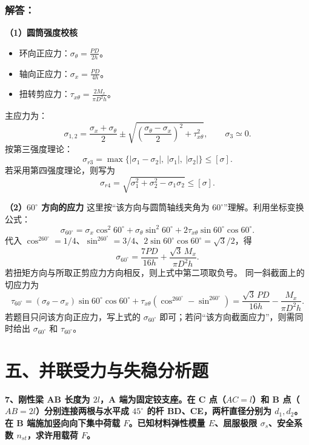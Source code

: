 \documentclass[11pt,a4paper]{ctexrep}
\begin{document}
{\subsubsection*{解答：}
\textbf{（1）圆筒强度校核}
\begin{itemize}
    \item 环向正应力：$\sigma_\theta = \frac{P D}{2h}$。
    \item 轴向正应力：$\sigma_x = \frac{P D}{4h}$。
    \item 扭转剪应力：$\tau_{x\theta} = \frac{2 M_x}{\pi D^2 h}$。
\end{itemize}
主应力为：
\[
    \sigma_{1,2} =
    \frac{\sigma_x+\sigma_\theta}{2}
    \pm
    \sqrt{\left(\frac{\sigma_\theta-\sigma_x}{2}\right)^2+\tau_{x\theta}^2},
    \qquad \sigma_3\simeq0.
\]
按第三强度理论：
\[
    \sigma_{r3}
    =
    \max\{|\sigma_1-\sigma_2|,\ |\sigma_1|,\ |\sigma_2|\}
    \le [\sigma]
    .
\]
若采用第四强度理论，则写为
\[
    \sigma_{r4}
    =
    \sqrt{\sigma_1^2+\sigma_2^2-\sigma_1\sigma_2}
    \le[\sigma].
\]

\textbf{（2）$60^\circ$ 方向的应力}
这里按“该方向与圆筒轴线夹角为 $60^\circ$”理解。利用坐标变换公式：
\[
    \sigma_{60^\circ}
    = \sigma_x \cos^2 60^\circ
    + \sigma_\theta \sin^2 60^\circ
    +2\tau_{x\theta}\sin60^\circ\cos60^\circ.
\]
代入 $\cos^260^\circ=1/4$、$\sin^260^\circ=3/4$、$2\sin60^\circ\cos60^\circ=\sqrt3/2$，得
\[
    \sigma_{60^\circ}
    =
    \frac{7PD}{16h}
    +\frac{\sqrt3\,M_x}{\pi D^2h}
    .
\]
若扭矩方向与所取正剪应力方向相反，则上式中第二项取负号。
同一斜截面上的切应力为
\[
    \tau_{60^\circ}
    =
    (\sigma_\theta-\sigma_x)\sin60^\circ\cos60^\circ
    +\tau_{x\theta}(\cos^260^\circ-\sin^260^\circ)
    =
    \frac{\sqrt3\,PD}{16h}
    -\frac{M_x}{\pi D^2h}.
\]
若题目只问该方向正应力，写上式的 $\sigma_{60^\circ}$ 即可；若问“该方向截面应力”，则需同时给出 $\sigma_{60^\circ}$ 和 $\tau_{60^\circ}$。




\section*{五、并联受力与失稳分析题}

\textbf{7、刚性梁 AB 长度为 $2l$，A 端为固定铰支座。在 C 点（$AC=l$）和 B 点（$AB=2l$）分别连接两根与水平成 $45^\circ$ 的杆 BD、CE，两杆直径分别为 $d_1,d_2$。在 B 端施加竖向向下集中荷载 $F$。已知材料弹性模量 $E$、屈服极限 $\sigma_s$、安全系数 $n_{st}$，求许用载荷 $F$。}

}
\end{document}
